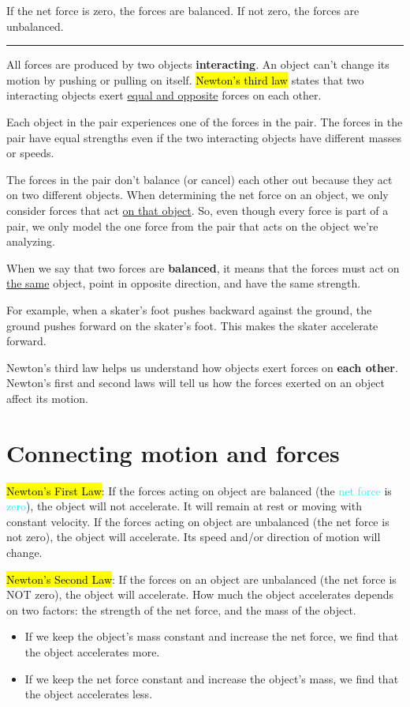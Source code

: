 If the net force is zero, the forces are balanced. If not zero, the forces are unbalanced.

\noindent\rule{\textwidth}{0.4pt}

All forces are produced by two objects \textbf{interacting}. An object can’t change its motion by pushing or pulling on itself. \hl{Newton's third law} states that two interacting objects exert \underline{equal and opposite} forces on each other.

Each object in the pair experiences one of the forces in the pair. The forces in the pair have equal strengths even if the two interacting objects have different masses or speeds.

The forces in the pair don't balance (or cancel) each other out because they act on two different objects. When determining the net force on an object, we only consider forces that act \underline{on that object}. So, even though every force is part of a pair, we only model the one force from the pair that acts on the object we're analyzing.

When we say that two forces are \textbf{balanced}, it means that the forces must act on \underline{the same} object, point in opposite direction, and have the same strength.

For example, when a skater’s foot pushes backward against the ground, the ground pushes forward on the skater’s foot. This makes the skater accelerate forward.

\vspace{.5cm}

Newton's third law helps us understand how objects exert forces on \textbf{each other}. Newton's first and second laws will tell us how the forces exerted on an object affect its motion. 

\section{Connecting motion and forces}

\hl{Newton's First Law}: If the forces acting on object are balanced (the \textcolor{cyan}{net force} is \textcolor{cyan}{zero}), the object will not accelerate. It will remain at rest or moving with constant velocity. If the forces acting on object are unbalanced (the net force is not zero), the object will accelerate. Its speed and/or direction of motion will change.

\hl{Newton's Second Law}: If the forces on an object are unbalanced (the net force is NOT zero), the object will accelerate. How much the object accelerates depends on two factors: the strength of the net force, and the mass of the object.

\begin{itemize}
  \item If we keep the object's mass constant and increase the net force, we find that the object accelerates more.
  \item If we keep the net force constant and increase the object's mass, we find that the object accelerates less.
\end{itemize}

